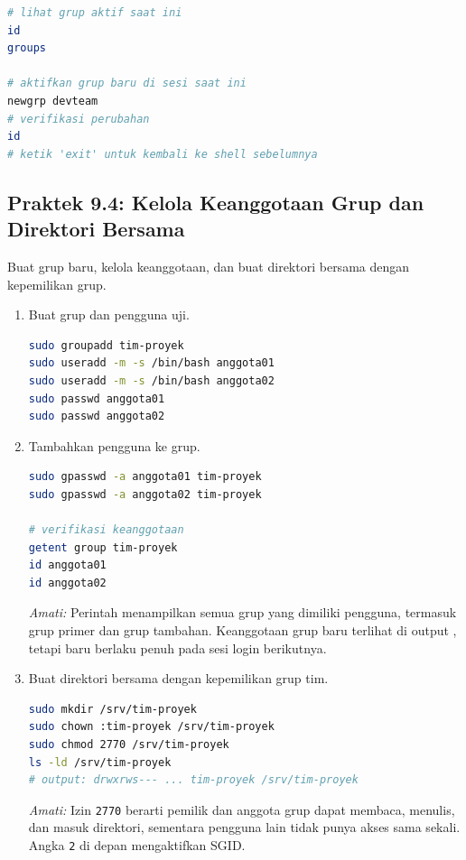 \begin{lstlisting}[language=bash, caption={Mengaktifkan grup baru tanpa logout}]
# lihat grup aktif saat ini
id
groups

# aktifkan grup baru di sesi saat ini
newgrp devteam
# verifikasi perubahan
id
# ketik 'exit' untuk kembali ke shell sebelumnya
\end{lstlisting}

\subsection*{Praktek 9.4: Kelola Keanggotaan Grup dan Direktori Bersama}

Buat grup baru, kelola keanggotaan, dan buat direktori bersama dengan kepemilikan grup.

\begin{enumerate}
    \item Buat grup dan pengguna uji.
\begin{lstlisting}[language=bash, caption={Membuat grup dan pengguna uji}]
sudo groupadd tim-proyek
sudo useradd -m -s /bin/bash anggota01
sudo useradd -m -s /bin/bash anggota02
sudo passwd anggota01
sudo passwd anggota02
\end{lstlisting}

    \item Tambahkan pengguna ke grup.
\begin{lstlisting}[language=bash, caption={Menambahkan anggota ke grup}]
sudo gpasswd -a anggota01 tim-proyek
sudo gpasswd -a anggota02 tim-proyek

# verifikasi keanggotaan
getent group tim-proyek
id anggota01
id anggota02
\end{lstlisting}

    \textit{Amati:} Perintah  menampilkan semua grup yang dimiliki pengguna, termasuk grup primer dan grup tambahan. Keanggotaan grup baru terlihat di output , tetapi baru berlaku penuh pada sesi login berikutnya.

    \item Buat direktori bersama dengan kepemilikan grup tim.
\begin{lstlisting}[language=bash, caption={Direktori bersama untuk tim proyek}]
sudo mkdir /srv/tim-proyek
sudo chown :tim-proyek /srv/tim-proyek
sudo chmod 2770 /srv/tim-proyek
ls -ld /srv/tim-proyek
# output: drwxrws--- ... tim-proyek /srv/tim-proyek
\end{lstlisting}

    \textit{Amati:} Izin \texttt{2770} berarti pemilik dan anggota grup dapat membaca, menulis, dan masuk direktori, sementara pengguna lain tidak punya akses sama sekali. Angka \texttt{2} di depan mengaktifkan SGID.


\end{enumerate}
